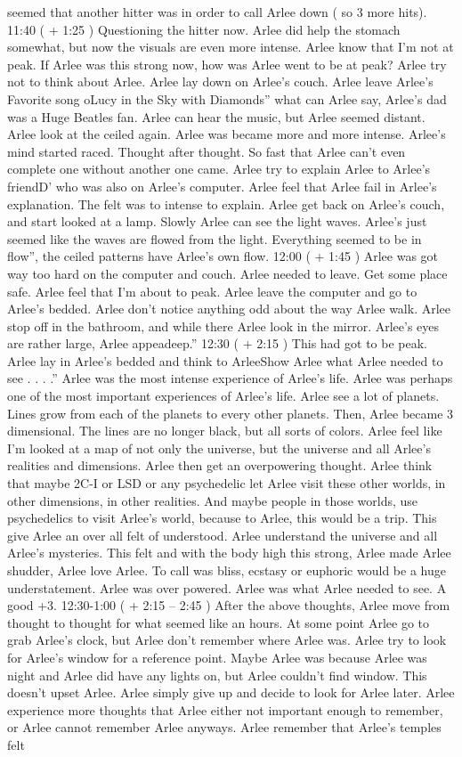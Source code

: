 \documentclass[12pt]{book}
\begin{document}
seemed that another hitter was in order to call Arlee down ( so 3 more hits). 11:40 ( + 1:25 ) Questioning the hitter now. Arlee did help the stomach somewhat, but now the visuals are even more intense. Arlee know that I'm not at peak. If Arlee was this strong now, how was Arlee went to be at peak? Arlee try not to think about Arlee. Arlee lay down on Arlee's couch. Arlee leave Arlee's Favorite song oLucy in the Sky with Diamonds'' what can Arlee say, Arlee's dad was a Huge Beatles fan. Arlee can hear the music, but Arlee seemed distant. Arlee look at the ceiled again. Arlee was became more and more intense. Arlee's mind started raced. Thought after thought. So fast that Arlee can't even complete one without another one came. Arlee try to explain Arlee to Arlee's friendD' who was also on Arlee's computer. Arlee feel that Arlee fail in Arlee's explanation. The felt was to intense to explain. Arlee get back on Arlee's couch, and start looked at a lamp. Slowly Arlee can see the light waves. Arlee's just seemed like the waves are flowed from the light. Everything seemed to be in flow'', the ceiled patterns have Arlee's own flow. 12:00 ( + 1:45 ) Arlee was got way too hard on the computer and couch. Arlee needed to leave. Get some place safe. Arlee feel that I'm about to peak. Arlee leave the computer and go to Arlee's bedded. Arlee don't notice anything odd about the way Arlee walk. Arlee stop off in the bathroom, and while there Arlee look in the mirror. Arlee's eyes are rather large, Arlee appeadeep.'' 12:30 ( + 2:15 ) This had got to be peak. Arlee lay in Arlee's bedded and think to ArleeShow Arlee what Arlee needed to see . . . .'' Arlee was the most intense experience of Arlee's life. Arlee was perhaps one of the most important experiences of Arlee's life. Arlee see a lot of planets. Lines grow from each of the planets to every other planets. Then, Arlee became 3 dimensional. The lines are no longer black, but all sorts of colors. Arlee feel like I'm looked at a map of not only the universe, but the universe and all Arlee's realities and dimensions. Arlee then get an overpowering thought. Arlee think that maybe 2C-I or LSD or any psychedelic let Arlee visit these other worlds, in other dimensions, in other realities. And maybe people in those worlds, use psychedelics to visit Arlee's world, because to Arlee, this would be a trip. This give Arlee an over all felt of understood. Arlee understand the universe and all Arlee's mysteries. This felt and with the body high this strong, Arlee made Arlee shudder, Arlee love Arlee. To call was bliss, ecstasy or euphoric would be a huge understatement. Arlee was over powered. Arlee was what Arlee needed to see. A good +3. 12:30-1:00 ( + 2:15 -- 2:45 ) After the above thoughts, Arlee move from thought to thought for what seemed like an hours. At some point Arlee go to grab Arlee's clock, but Arlee don't remember where Arlee was. Arlee try to look for Arlee's window for a reference point. Maybe Arlee was because Arlee was night and Arlee did have any lights on, but Arlee couldn't find window. This doesn't upset Arlee. Arlee simply give up and decide to look for Arlee later. Arlee experience more thoughts that Arlee either not important enough to remember, or Arlee cannot remember Arlee anyways. Arlee remember that Arlee's temples felt 
\end{document}

